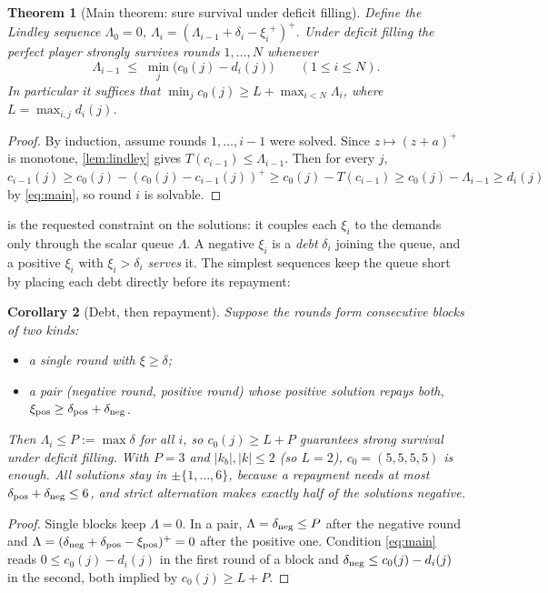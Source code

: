 \documentclass[11pt,a4paper]{article}
\newtheorem{theorem}{Theorem}[section]
\newtheorem{corollary}[theorem]{Corollary}
\theoremstyle{definition}
\theoremstyle{remark}
\newcommand{\abs}[1]{\lvert #1\rvert}
\newcommand{\pos}[1]{{#1}^{+}}
\begin{document}
\begin{theorem}[Main theorem: sure survival under deficit filling]\label{thm:main}
Define the Lindley sequence $\Lambda_0=0$,
$\Lambda_i=(\Lambda_{i-1}+\delta_i-\pos{\xi_i})^+$. Under deficit filling the perfect
player strongly survives rounds $1,\dots,N$ whenever
\begin{equation}\label{eq:main}
\Lambda_{i-1}\;\le\;\min_{j}\bigl(c_0(j)-d_i(j)\bigr)\qquad(1\le i\le N).
\end{equation}
In particular it suffices that $\min_jc_0(j)\ge L+\max_{i<N}\Lambda_i$, where
$L=\max_{i,j}d_i(j)$.
\end{theorem}
\begin{proof}
By induction, assume rounds $1,\dots,i-1$ were solved. Since $z\mapsto(z+a)^+$ is
monotone, \cref{lem:lindley} gives $T(c_{i-1})\le\Lambda_{i-1}$. Then for every $j$,
$c_{i-1}(j)\ge c_0(j)-(c_0(j)-c_{i-1}(j))^+\ge c_0(j)-T(c_{i-1})\ge c_0(j)-\Lambda_{i-1}\ge d_i(j)$
by \eqref{eq:main}, so round $i$ is solvable.
\end{proof}

 is the requested constraint on the solutions: it couples each
$\xi_i$ to the demands only through the scalar queue $\Lambda$. A negative $\xi_i$ is a
\emph{debt} $\delta_i$ joining the queue, and a positive $\xi_i$ with
$\xi_i>\delta_i$ \emph{serves} it. The simplest sequences keep the queue short by placing
each debt directly before its repayment:

\begin{corollary}[Debt, then repayment]\label{cor:alternating}
Suppose the rounds form consecutive blocks of two kinds:
\begin{itemize}[nosep]
\item a single round with $\xi\ge\delta$;
\item a pair (negative round, positive round) whose positive solution repays both,
  $\xi_{\rm pos}\ge\delta_{\rm pos}+\delta_{\rm neg}$.
\end{itemize}
Then $\Lambda_i\le P:=\max\delta$ for all $i$, so $c_0(j)\ge L+P$ guarantees strong
survival under deficit filling. With $P=3$ and $\abs{k_b},\abs k\le2$ (so $L=2$),
$c_0=(5,5,5,5)$ is enough. All solutions stay in $\pm\{1,\dots,6\}$, because a
repayment needs at most $\delta_{\rm pos}+\delta_{\rm neg}\le6$, and strict alternation
makes exactly half of the solutions negative.
\end{corollary}
\begin{proof}
Single blocks keep $\Lambda=0$. In a pair, $\Lambda=\delta_{\rm neg}\le P$ after the
negative round and $\Lambda=(\delta_{\rm neg}+\delta_{\rm pos}-\xi_{\rm pos})^+=0$ after
the positive one. Condition \eqref{eq:main} reads $0\le c_0(j)-d_i(j)$ in the first
round of a block and $\delta_{\rm neg}\le c_0(j)-d_i(j)$ in the second, both implied
by $c_0(j)\ge L+P$.
\end{proof}
\end{document}
